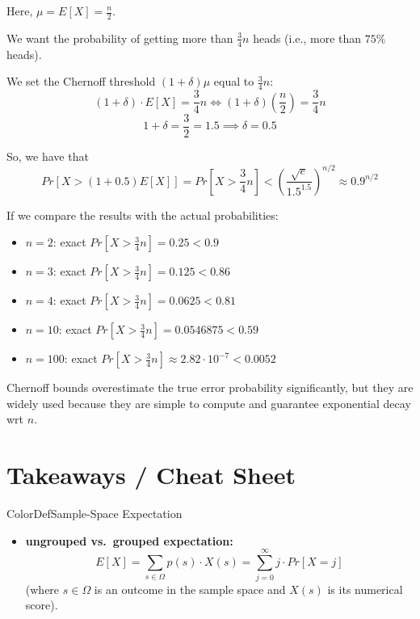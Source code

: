 \documentclass[a4paper, 11pt]{report}
\begin{document}
Here, $\mu = E[X] = \frac{n}{2}$. 

We want the probability of getting more than $\frac{3}{4}n$ heads (i.e., more than $75\%$ heads).

We set the Chernoff threshold $(1 + \delta)\mu$ equal to $\frac{3}{4}n$:
$$(1 + \delta) \cdot E[X] = \frac{3}{4}n \iff (1 + \delta)\left(\frac{n}{2}\right) = \frac{3}{4}n$$
$$1 + \delta = \frac{3}{2} = 1.5 \implies \delta = 0.5$$

So, we have that
$$Pr\left[X > (1 + 0.5)E[X]\right] = Pr\left[X > \frac{3}{4}n\right] < \left( \frac{\sqrt{e}}{1.5^{1.5}} \right)^{n/2} \approx 0.9^{n/2}$$

If we compare the results with the actual probabilities:
\begin{itemize}
    \item $n = 2$: exact $Pr\left[X > \frac{3}{4}n\right] = 0.25 < 0.9$
    \item $n = 3$: exact $Pr\left[X > \frac{3}{4}n\right] = 0.125 < 0.86$
    \item $n = 4$: exact $Pr\left[X > \frac{3}{4}n\right] = 0.0625 < 0.81$
    \item $n = 10$: exact $Pr\left[X > \frac{3}{4}n\right] = 0.0546875 < 0.59$
    \item $n = 100$: exact $Pr\left[X > \frac{3}{4}n\right] \approx 2.82 \cdot 10^{-7} < 0.0052$
\end{itemize}

Chernoff bounds overestimate the true error probability significantly, but they are widely used because they are simple to compute and guarantee exponential decay wrt $n$.
\section{Takeaways / Cheat Sheet}

\begin{cframe}{ColorDef}{Sample-Space Expectation}{}
    \begin{itemize}
        \item \textbf{ungrouped vs.\ grouped expectation:}
            $$E[X] = \sum_{s \in \Omega} p(s) \cdot X(s) = \sum_{j=0}^\infty j \cdot Pr[X = j]$$
            (where $s \in \Omega$ is an outcome in the sample space and $X(s)$ is its numerical score).
    \end{itemize}
\end{cframe}
\end{document}
